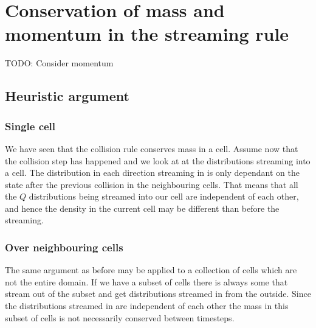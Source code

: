 

\section{Conservation of mass and momentum in the streaming rule}

TODO: Consider momentum

\subsection{Heuristic argument}

\subsubsection{Single cell}

We have seen that the collision rule conserves mass in a cell.
Assume now that the collision step has happened and we look at at the distributions
streaming into a cell. The distribution in each direction streaming in is only 
dependant on the state after the previous collision in the neighbouring cells.
That means that all the $Q$ distributions being streamed into our cell are
independent of each other, and hence the density in the current cell may be 
different than before the streaming.


\subsubsection{Over neighbouring cells}

The same argument as before may be applied to a collection of cells which are not
the entire domain. If we have a subset of cells there is always some that stream
out of the subset and get distributions streamed in from the outside. Since the 
distributions streamed in are independent of each other the mass in this subset
of cells is not necessarily conserved between timesteps.

